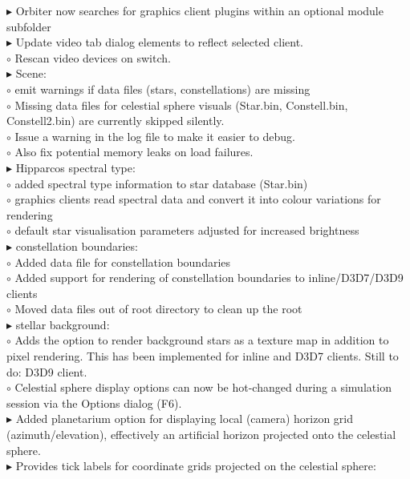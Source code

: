 \documentclass[Orbiter User Manual.tex]{subfiles}
\begin{document}
\begin{sloppypar}
$\blacktriangleright$ Orbiter now searches for graphics client plugins within an optional module subfolder\\
$\blacktriangleright$ Update video tab dialog elements to reflect selected client.\\
$\circ$ Rescan video devices on switch.\\
$\blacktriangleright$ Scene:\\
$\circ$ emit warnings if data files (stars, constellations) are missing\\
$\circ$ Missing data files for celestial sphere visuals (Star.bin, Constell.bin, Constell2.bin) are currently skipped silently.\\
$\circ$ Issue a warning in the log file to make it easier to debug.\\
$\circ$ Also fix potential memory leaks on load failures.\\
$\blacktriangleright$ Hipparcos spectral type:\\
$\circ$ added spectral type information to star database (Star.bin)\\
$\circ$ graphics clients read spectral data and convert it into colour variations for rendering\\
$\circ$ default star visualisation parameters adjusted for increased brightness\\
$\blacktriangleright$ constellation boundaries:\\
$\circ$ Added data file for constellation boundaries\\
$\circ$ Added support for rendering of constellation boundaries to inline/D3D7/D3D9 clients\\
$\circ$ Moved data files out of root directory to clean up the root\\
$\blacktriangleright$ stellar background:\\
$\circ$ Adds the option to render background stars as a texture map in addition to pixel rendering. This has been implemented for inline and D3D7 clients. Still to do: D3D9 client.\\
$\circ$ Celestial sphere display options can now be hot-changed during a simulation session via the Options dialog (F6).\\
$\blacktriangleright$ Added planetarium option for displaying local (camera) horizon grid (azimuth/elevation), effectively an artificial horizon projected onto the celestial sphere.\\
$\blacktriangleright$ Provides tick labels for coordinate grids projected on the celestial sphere:\\

\end{sloppypar}
\end{document}
